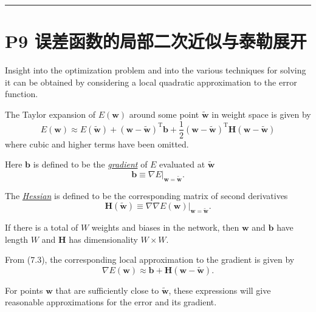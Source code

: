 \documentclass{article}
\begin{document}

\noindent\rule{\linewidth}{0.4pt}
 
\section{P9 误差函数的局部二次近似与泰勒展开}

Insight into the optimization problem and into the various techniques for solving it can be obtained by considering a local quadratic approximation to the error function. 

The Taylor expansion of $E(\mathbf{w})$ around some point $\tilde{\mathbf{w}}$ in weight space is given by
\begin{equation}
E(\mathbf{w}) \approx E(\tilde{\mathbf{w}}) + (\mathbf{w} - \tilde{\mathbf{w}})^\mathrm{T} \mathbf{b} + \frac{1}{2} (\mathbf{w} - \tilde{\mathbf{w}})^\mathrm{T} \mathbf{H} (\mathbf{w} - \tilde{\mathbf{w}})
\tag{7.3}
\end{equation}
where cubic and higher terms have been omitted. 

Here $\mathbf{b}$ is defined to be the \underline{\emph{gradient}} of $E$ evaluated at $\tilde{\mathbf{w}}$
\begin{equation}
\mathbf{b} \equiv \left.\nabla E\right|_{\mathbf{w} = \tilde{\mathbf{w}}}.
\tag{7.4}
\end{equation}

The \underline{\emph{Hessian}} is defined to be the corresponding matrix of second derivatives
\begin{equation}
\mathbf{H}(\tilde{\mathbf{w}}) \equiv \left.\nabla\nabla E(\mathbf{w})\right|_{\mathbf{w} = \tilde{\mathbf{w}}}.
\tag{7.5}
\end{equation}

If there is a total of $W$ weights and biases in the network, then $\mathbf{w}$ and $\mathbf{b}$ have length $W$ and $\mathbf{H}$ has dimensionality $W \times W$. 

From {(7.3)}, the corresponding local approximation to the gradient is given by
\begin{equation}
\nabla E(\mathbf{w}) \approx \mathbf{b} + \mathbf{H}(\mathbf{w} - \tilde{\mathbf{w}}).
\tag{7.6}
\end{equation}

For points $\mathbf{w}$ that are sufficiently close to $\tilde{\mathbf{w}}$, these expressions will give reasonable approximations for the error and its gradient.
\end{document}
